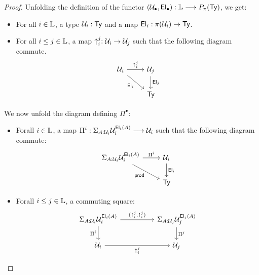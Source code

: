 \documentclass{article}
\begin{document}
\begin{proof}
    Unfolding the definition of the functor $(\mathcal{U}_\bullet, \textsf{El}_\bullet) : \mathbb{L} \longrightarrow P_\pi(\textsf{Ty})$, we get:
    \begin{itemize}
        \item For all $i \in \mathbb{L}$, a type $\mathcal{U}_i : \textsf{Ty}$ and a map $\textsf{El}_i : \pi(\mathcal{U}_i) \rightarrow \textsf{Ty}$.
        \item For all $i \leq j \in \mathbb{L}$, a map $\uparrow_i^j : \mathcal{U}_i \rightarrow \mathcal{U}_j$  such that the following diagram commute.
        \[\begin{tikzcd}
            {\mathcal{U}_i} & {\mathcal{U}_j} \\
            & {\mathsf{Ty}}
            \arrow["{\uparrow_i^j}", from=1-1, to=1-2]
            \arrow["{\mathsf{El}_i}"', from=1-1, to=2-2]
            \arrow["{\mathsf{El}_j}", from=1-2, to=2-2]
        \end{tikzcd}\]
    \end{itemize}

    We now unfold the diagram defining $\Pi^\bullet$:
    \begin{itemize}
        \item Forall $i \in \mathbb{L}$, a map $\Pi^i : \Sigma_{A: \mathcal{U}_i} \mathcal{U}_i^{\textsf{El}_i(A)} \longrightarrow \mathcal{U}_i$ such that the following diagram commute:
            \[\begin{tikzcd}
                {\Sigma_{A: \cU_i} \cU_i^{\El_i(A)}} & {\mathcal{U}_i} \\
                & {\mathsf{Ty}}
                \arrow["{\Pi^i}", from=1-1, to=1-2]
                \arrow["{\mathsf{prod}}"', from=1-1, to=2-2]
                \arrow["{\mathsf{El}_i}", from=1-2, to=2-2]
            \end{tikzcd}\]
        \item Forall $i \leq j \in \mathbb{L}$, a commuting square: 
            \[\begin{tikzcd}
                {\Sigma_{A: \cU_i} \cU_i^{\El_i(A)}} && {\Sigma_{A: \cU_j} \cU_j^{\El_j(A)}}\\
                {\mathcal{U}_i} && {\mathcal{U}_j}
                \arrow["{(\uparrow_i^j,\uparrow_i^j)}", from=1-1, to=1-3]
                \arrow["{\Pi^i}"', from=1-1, to=2-1]
                \arrow["{\Pi^j}", from=1-3, to=2-3]
                \arrow["{\uparrow_i^j}"', from=2-1, to=2-3]
            \end{tikzcd}\]
    \end{itemize}


\end{proof}
\end{document}
